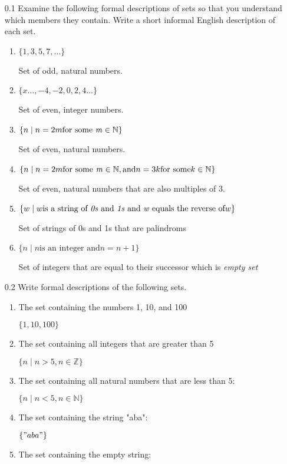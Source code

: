 \begin{enumerate}

    \item[0.1]
Examine the following formal descriptions of sets so that you understand which members they contain. Write a short informal English description of each set.
\begin{enumerate}

\item 
$\{1, 3, 5, 7, \ldots \}$

Set of odd, natural numbers.
\item 
$\{x \ldots, -4, -2, 0, 2, 4 \ldots \}$

Set of even, integer numbers.
\item 
$\{n \mid n = 2m \text{for some \textit{m}} \in \mathbb{N} \}$

Set of even, natural numbers.
\item 
$\{n \mid n = 2m \text{for some \textit{m}} \in \mathbb{N}, \text{and} n = 3k \text{for some} k \in \mathbb{N} \}$

Set of even, natural numbers that are also multiples of 3.
\item 
$\{w \mid w  \text{is a string of \textit{0s} and \textit{1s} and \textit{w} equals the reverse of} w\}$

Set of strings of 0s and 1s that are palindroms 
\item $\{ n \mid n \text{is an integer and}  n = n+1\}$

Set of integers that are equal to their successor which is \textit{empty set}
\end{enumerate}

    \item[0.2]
Write  formal descriptions  of the following sets.

\begin{enumerate}
\item The set containing the numbers 1, 10, and 100

    $\{1, 10, 100\}$
\item The set containing all integers that are greater than 5
    
    $\{n \mid n > 5, n \in \mathbb{Z}\}$
\item  The set containing all natural numbers that are less than 5:

    $\{n \mid n < 5, n \in \mathbb{N}\}$
\item The set containing the string "aba":

    $\{"aba"\}$
\item The set containing the empty string:


\end{enumerate}
\end{enumerate}
